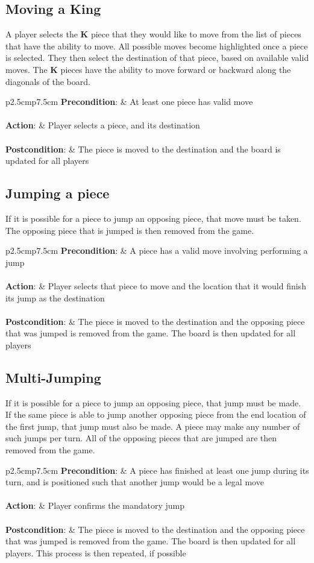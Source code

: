 \documentclass[letterpaper]{article}
\newcommand{\prepost}[3]
{
    \begin{tabulary}{\linewidth}{p{2.5cm}p{7.5cm}}
    \textbf{Precondition}:  & #1\\\\
    \textbf{Action}:        & #2\\\\
    \textbf{Postcondition}: & #3\\
    \end{tabulary}
}
\begin{document}
\subsection{Moving a King}
\label{sec:usecases_moveking}

A player selects the \textbf{K} piece that they would like to
move from the list of pieces that have the ability to move. All
possible moves become highlighted once a piece is selected. They
then select the destination of that piece, based on available
valid moves. The \textbf{K} pieces have the ability to move
forward or backward along the diagonals of the board.\\

\prepost
{At least one piece has valid move}
{Player selects a piece, and its destination}
{The piece is moved to the destination and the board is updated
for all players}

\subsection{Jumping a piece}
\label{sec:usecases_jump}

If it is possible for a piece to jump an opposing piece, that
move must be taken. The opposing piece that is jumped is then
removed from the game.\\

\prepost
{A piece has a valid move involving performing a jump}
{Player selects that piece to move and the location that it
would finish its jump as the destination}
{The piece is moved to the destination and the opposing piece
that was jumped is removed from the game. The board is then
updated for all players}

\subsection{Multi-Jumping}
\label{sec:usecases_multijump}

If it is possible for a piece to jump an opposing piece, that
jump must be made. If the same piece is able to jump another
opposing piece from the end location of the first jump, that
jump must also be made. A piece may make any number of such
jumps per turn. All of the opposing pieces that are jumped are
then removed from the game.\\

\prepost
{A piece has finished at least one jump during its turn, and
is positioned such that another jump would be a legal move}
{Player confirms the mandatory jump}
{The piece is moved to the destination and the opposing piece
that was jumped is removed from the game. The board is then
updated for all players. This process is then repeated, if
possible}
\end{document}
